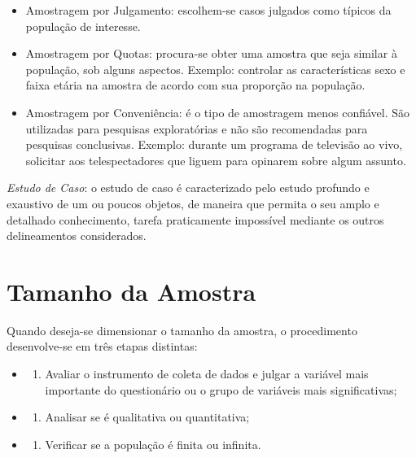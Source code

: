 \documentclass[12pt,brazil,oneside]{book}
\providecommand{\tightlist}{%
  \setlength{\itemsep}{0pt}\setlength{\parskip}{0pt}}
\begin{document}
\begin{itemize}
\tightlist
\item
  Amostragem por Julgamento: escolhem-se casos julgados como típicos da população de interesse.
\item
  Amostragem por Quotas: procura-se obter uma amostra que seja similar à população, sob alguns aspectos.
  Exemplo: controlar as características sexo e faixa etária na amostra de acordo com sua proporção na população.
\item
  Amostragem por Conveniência: é o tipo de amostragem menos confiável. São utilizadas para pesquisas exploratórias e não são recomendadas para pesquisas conclusivas. Exemplo: durante um programa de televisão ao vivo, solicitar aos telespectadores que liguem para opinarem sobre algum assunto.
\end{itemize}

\emph{Estudo de Caso}: o estudo de caso é caracterizado pelo estudo profundo e exaustivo de um ou poucos objetos, de maneira que permita o seu amplo e detalhado conhecimento, tarefa praticamente impossível mediante os outros delineamentos considerados.

\hypertarget{tamanho-da-amostra}{%
\section{Tamanho da Amostra}\label{tamanho-da-amostra}}

Quando deseja-se dimensionar o tamanho da amostra, o procedimento desenvolve-se em três etapas distintas:

\begin{itemize}
\item
  \begin{enumerate}
  \def\labelenumi{\arabic{enumi}.}
  \tightlist
  \item
    Avaliar o instrumento de coleta de dados e julgar a variável mais importante do questionário ou o grupo de variáveis mais significativas;
  \end{enumerate}
\item
  \begin{enumerate}
  \def\labelenumi{\arabic{enumi}.}
  \setcounter{enumi}{1}
  \tightlist
  \item
    Analisar se é qualitativa ou quantitativa;
  \end{enumerate}
\item
  \begin{enumerate}
  \def\labelenumi{\arabic{enumi}.}
  \setcounter{enumi}{2}
  \tightlist
  \item
    Verificar se a população é finita ou infinita.
  \end{enumerate}
\end{itemize}
\end{document}
